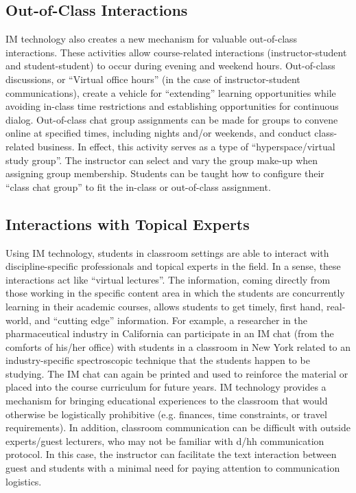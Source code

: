 \documentclass[11.5pt]{sig-alternate} %
\begin{document}
\begin{large}
\subsection*{Out-of-Class Interactions}

IM technology also creates a new mechanism for valuable out-of-class interactions. These activities allow course-related interactions (instructor-student and student-student) to occur during evening and weekend hours. Out-of-class discussions, or “Virtual office hours” (in the case of instructor-student communications), create a vehicle for “extending” learning opportunities while avoiding in-class time restrictions and establishing opportunities for continuous dialog. Out-of-class chat group assignments can be made for groups to convene online at specified times, including nights and/or weekends, and conduct class-related business. In effect, this activity serves as a type of “hyperspace/virtual study group”. The instructor can select and vary the group make-up when assigning group membership. Students can be taught how to configure their “class chat group” to fit the in-class or out-of-class assignment. 

\subsection*{Interactions with Topical Experts}

Using IM technology, students in classroom settings are able to interact with discipline-specific professionals and topical experts in the field. In a sense, these interactions act like “virtual lectures”. The information, coming directly from those working in the specific content area in which the students are concurrently learning in their academic courses, allows students to get timely, first hand, real-world, and “cutting edge” information. For example, a researcher in the pharmaceutical industry in California can participate in an IM chat (from the comforts of his/her office) with students in a classroom in New York related to an industry-specific spectroscopic technique that the students happen to be studying. The IM chat can again be printed and used to reinforce the material or placed into the course curriculum for future years. IM technology provides a mechanism for bringing educational experiences to the classroom that would otherwise be logistically prohibitive (e.g. finances, time constraints, or travel requirements). In addition, classroom communication can be difficult with outside experts/guest lecturers, who may not be familiar with d/hh communication protocol. In this case, the instructor can facilitate the text interaction between guest and students with a minimal need for paying attention to communication logistics. 


\end{large}
\end{document}
